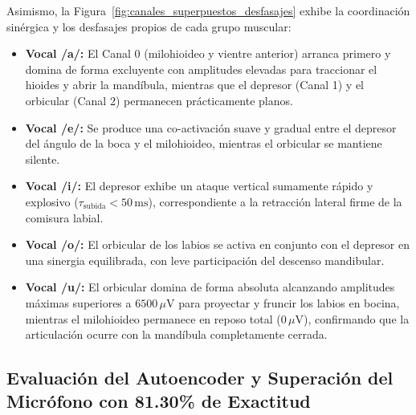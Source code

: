 \documentclass[11pt,a4paper]{article}
\begin{document}
Asimismo, la Figura~\ref{fig:canales_superpuestos_desfasajes} exhibe la coordinación sinérgica y los desfasajes propios de cada grupo muscular:
\begin{itemize}
    \item \textbf{Vocal /a/:} El Canal 0 (milohioideo y vientre anterior) arranca primero y domina de forma excluyente con amplitudes elevadas para traccionar el hioides y abrir la mandíbula, mientras que el depresor (Canal 1) y el orbicular (Canal 2) permanecen prácticamente planos.
    \item \textbf{Vocal /e/:} Se produce una co-activación suave y gradual entre el depresor del ángulo de la boca y el milohioideo, mientras el orbicular se mantiene silente.
    \item \textbf{Vocal /i/:} El depresor exhibe un ataque vertical sumamente rápido y explosivo ($\tau_{\text{subida}} < 50\,\text{ms}$), correspondiente a la retracción lateral firme de la comisura labial.
    \item \textbf{Vocal /o/:} El orbicular de los labios se activa en conjunto con el depresor en una sinergia equilibrada, con leve participación del descenso mandibular.
    \item \textbf{Vocal /u/:} El orbicular domina de forma absoluta alcanzando amplitudes máximas superiores a $6500\,\mu\text{V}$ para proyectar y fruncir los labios en bocina, mientras el milohioideo permanece en reposo total ($0\,\mu\text{V}$), confirmando que la articulación ocurre con la mandíbula completamente cerrada.
\end{itemize}

\subsection{Evaluación del Autoencoder y Superación del Micrófono con 81.30\% de Exactitud}
\label{subsec:evaluacion_autoencoder_gate_doble}
\end{document}
